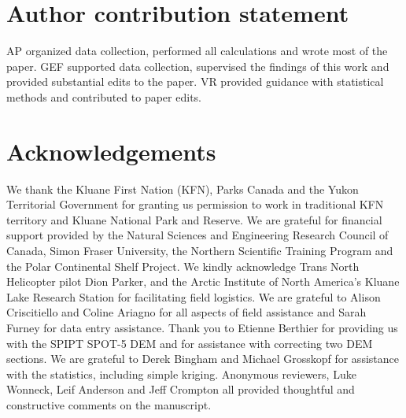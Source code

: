 \documentclass[twocolumn, letterpaper]{igs}
\begin{document}
\section{Author contribution statement}

AP organized data collection, performed all calculations and wrote most of the paper. GEF supported data collection, supervised the findings of this work and provided substantial edits to the paper. VR provided guidance with statistical methods and contributed to paper edits.

\section{Acknowledgements}

We thank the Kluane First Nation (KFN), Parks Canada and the Yukon Territorial Government for granting us permission to work in traditional KFN territory and Kluane National Park and Reserve. We are grateful for financial support provided by the Natural Sciences and Engineering Research Council of  Canada, Simon Fraser University, the Northern Scientific  Training  Program and the Polar Continental Shelf Project. We kindly acknowledge Trans North Helicopter pilot Dion Parker, and the Arctic Institute of North America's Kluane Lake Research Station for facilitating field logistics. We are grateful to Alison Criscitiello and Coline Ariagno for all aspects of field assistance and Sarah Furney for data entry assistance. Thank you to Etienne Berthier for providing us with the SPIPT SPOT-5 DEM and for assistance with correcting two DEM sections. We are grateful to Derek Bingham and Michael Grosskopf for assistance with the statistics, including simple kriging. Anonymous reviewers, Luke Wonneck, Leif Anderson and Jeff Crompton all provided
thoughtful and constructive comments on the
manuscript.


%

%


\end{document}
